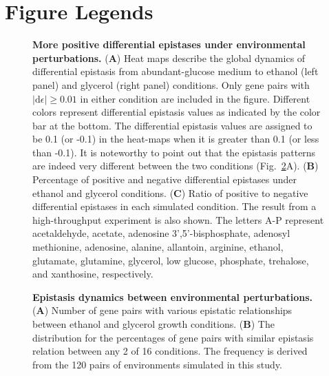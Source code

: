 \documentclass[10pt]{article}
\def\D{\mathrm{d}}
\newcommand{\Fig}{Fig.}
\begin{document}
%
%
% 

\section*{Figure Legends}
%

\begin{figure}[H]
\caption{
{\bf More positive differential epistases under environmental
perturbations.} (\textbf{A}) Heat maps describe the global dynamics of
differential epistasis from abundant-glucose medium to ethanol (left
panel) and glycerol (right panel) conditions. Only gene pairs with
$\left|\D\epsilon\right| \geq 0.01$ in either condition are included
in the figure. Different colors represent differential epistasis
values as indicated by the color bar at the bottom. The differential
epistasis values are assigned to be 0.1 (or -0.1) in the heat-maps
when it is greater than 0.1 (or less than -0.1). It is noteworthy to
point out that the epistasis patterns are indeed very different
between the two conditions (\Fig~\ref{fig:eef2}A). (\textbf{B})
Percentage of positive and negative differential epistases under
ethanol and glycerol conditions. (\textbf{C}) Ratio of positive to
negative differential epistases
in each simulated condition. The result from a high-throughput
experiment is also shown. The letters A-P represent acetaldehyde,
acetate, adenosine 3',5'-bisphosphate, adenosyl methionine, adenosine,
alanine, allantoin, arginine, ethanol, glutamate, glutamine, glycerol,
low glucose, phosphate, trehalose, and xanthosine, respectively.
}
\label{fig:eef1}
\end{figure}

\begin{figure}
\caption{
{\bf Epistasis dynamics between environmental perturbations.} (\textbf{A}) 
Number of gene pairs with various epistatic relationships between ethanol and
glycerol growth conditions. (\textbf{B}) The distribution for the percentages
of gene pairs with similar epistasis relation between any 2 of 16
conditions. The frequency is derived from the 120 pairs of
environments simulated in this study.
}
\label{fig:eef2}
\end{figure}
\end{document}
